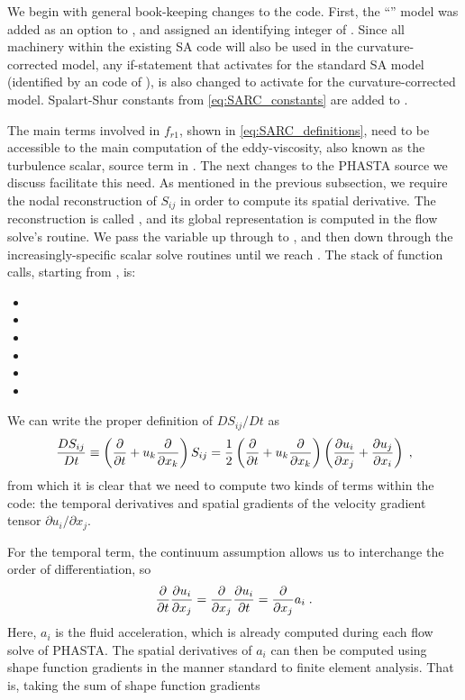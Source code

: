 \documentclass[11pt]{article}
\begin{document}
We begin with general book-keeping changes to the code. First, the ``'' model was added as an option to , and assigned an identifying  integer of . Since all machinery within the existing SA code will also be used in the curvature-corrected model, any if-statement that activates for the standard SA model (identified by an  code of ), is also changed to activate for the curvature-corrected model. Spalart-Shur constants from \eqref{eq:SARC_constants} are added to .

The main terms involved in $f_{r1}$, shown in \eqref{eq:SARC_definitions}, need to be accessible to the main computation of the eddy-viscosity, also known as the turbulence scalar, source term in . The next changes to the PHASTA source we discuss facilitate this need. As mentioned in the previous subsection, we require the nodal reconstruction of $S_{ij}$ in order to compute its spatial derivative. The reconstruction is called , and its global representation is computed in the flow solve's  routine. We pass the variable up through  to , and then down through the increasingly-specific scalar solve routines until we reach . The stack of function calls, starting from , is:
\begin{itemize}
\item {}
\item {}
\item {}
\item {}
\item {}
\item {}
\end{itemize}

 We can write the proper definition of $DS_{ij}/Dt$ as
\begin{equation}
\frac{DS_{ij}}{Dt}
\equiv
\left( \frac{\partial}{\partial t} + u_k \frac{\partial}{\partial x_k} \right) S_{ij}
=
\frac{1}{2}
\left( \frac{\partial}{\partial t} + u_k \frac{\partial}{\partial x_k} \right)
\left( \frac{\partial u_i}{\partial x_j} + \frac{\partial u_j}{\partial x_i} \right)
\;,
\end{equation}
from which it is clear that we need to compute two kinds of terms within the code: the temporal derivatives and spatial gradients of the velocity gradient tensor $\partial u_i / \partial x_j$.

For the temporal term, the continuum assumption allows us to interchange the order of differentiation, so
\begin{equation}
\frac{\partial}{\partial t} \frac{\partial u_i}{\partial x_j}
=
\frac{\partial}{\partial x_j} \frac{\partial u_i}{\partial t}
=
\frac{\partial}{\partial x_j} a_i
\;.
\end{equation}
Here, $a_i$ is the fluid acceleration, which is already computed during each flow solve of PHASTA. The spatial derivatives of $a_i$ can then be computed using shape function gradients in the manner standard to finite element analysis. That is, taking the sum of shape function gradients 
\end{document}
